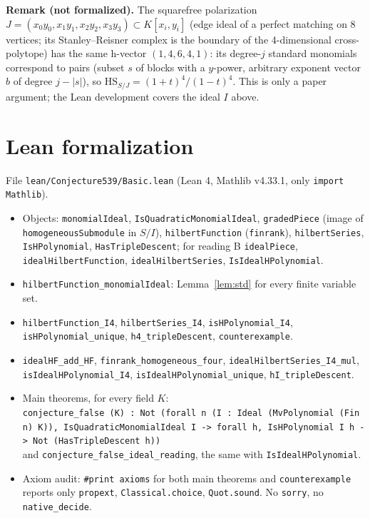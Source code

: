 \documentclass[11pt]{article}
\theoremstyle{definition}
\begin{document}
\noindent\textbf{Remark (not formalized).} The squarefree polarization
$J=(x_0y_0,x_1y_1,x_2y_2,x_3y_3)\subset K[x_i,y_i]$ (edge ideal of a perfect matching on 8
vertices; its Stanley--Reisner complex is the boundary of the 4-dimensional cross-polytope)
has the same h-vector $(1,4,6,4,1)$: its degree-$j$ standard monomials correspond to pairs
(subset $s$ of blocks with a $y$-power, arbitrary exponent vector $b$ of degree $j-|s|$), so
$\mathrm{HS}_{S/J}=(1+t)^4/(1-t)^4$. This is only a paper argument; the Lean development covers
the ideal $I$ above.

\section{Lean formalization}
File \texttt{lean/Conjecture539/Basic.lean} (Lean 4, Mathlib v4.33.1, only \texttt{import Mathlib}).
\begin{itemize}
\item Objects: \texttt{monomialIdeal}, \texttt{IsQuadraticMonomialIdeal}, \texttt{gradedPiece}
 (image of \texttt{homogeneousSubmodule} in $S/I$), \texttt{hilbertFunction} (\texttt{finrank}),
 \texttt{hilbertSeries}, \texttt{IsHPolynomial}, \texttt{HasTripleDescent}; for reading B
 \texttt{idealPiece}, \texttt{idealHilbertFunction}, \texttt{idealHilbertSeries},
 \texttt{IsIdealHPolynomial}.
\item \texttt{hilbertFunction\_monomialIdeal}: Lemma~\ref{lem:std} for every finite variable set.
\item \texttt{hilbertFunction\_I4}, \texttt{hilbertSeries\_I4}, \texttt{isHPolynomial\_I4},
 \texttt{isHPolynomial\_unique}, \texttt{h4\_tripleDescent}, \texttt{counterexample}.
\item \texttt{idealHF\_add\_HF}, \texttt{finrank\_homogeneous\_four},
 \texttt{idealHilbertSeries\_I4\_mul}, \texttt{isIdealHPolynomial\_I4},
 \texttt{isIdealHPolynomial\_unique}, \texttt{hI\_tripleDescent}.
\item Main theorems, for every field $K$:\\
\texttt{conjecture\_false (K) : Not (forall n (I : Ideal (MvPolynomial (Fin n) K)), IsQuadraticMonomialIdeal I -> forall h, IsHPolynomial I h -> Not (HasTripleDescent h))}\\
and \texttt{conjecture\_false\_ideal\_reading}, the same with \texttt{IsIdealHPolynomial}.
\item Axiom audit: \texttt{\#print axioms} for both main theorems and \texttt{counterexample}
 reports only \texttt{propext}, \texttt{Classical.choice}, \texttt{Quot.sound}. No \texttt{sorry},
 no \texttt{native\_decide}.
\end{itemize}
\end{document}

